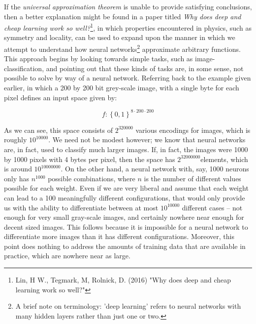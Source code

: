 \documentclass[11pt]{article}
\begin{document}
If the \textit{universal approximation theorem} is unable to provide satisfying conclusions, then a better explanation might be found in a paper titled \textit{Why does deep and cheap learning work so well?}\footnote{Lin, H W., Tegmark, M, Rolnick, D. (2016) "Why does deep and cheap learning work so well?"}, in which properties encountered in physics, such as symmetry and locality, can be used to expand upon the manner in which we attempt to understand how neural networks\footnote{A brief note on terminology: 'deep learning' refers to neural networks with many hidden layers rather than just one or two.} approximate arbitrary functions. This approach begins by looking towards simple tasks, such as image-classification, and pointing out that these kinds of tasks are, in some sense, not possible to solve by way of a neural network. Referring back to the example given earlier, in which a 200 by 200 bit grey-scale image, with a single byte for each pixel defines an input space given by:

\begin{equation}f: \left \{ 0,1 \right \}^{8\cdot 200 \cdot 200} \nonumber\end{equation}

As we can see, this space consists of $2^{320000}$ various encodings for images, which is roughly $10^{10000}$. We need not be modest however; we know that neural networks are, in fact, used to classify much larger images. If, in fact, the images were 1000 by 1000 pixels with 4 bytes per pixel, then the space has $2^{32000000}$elements, which is around $10^{10000000}$. On the other hand, a neural network with, say, 1000 neurons only has $n^{1000}$ possible combinations, where $n$ is the number of different values possible for each weight. Even if we are very liberal and assume that each weight can lead to a 100 meaningfully different configurations, that would only provide us with the ability to differentiate between at most $10^{10000}$ different cases – not enough for very small gray-scale images, and certainly nowhere near enough for decent sized images. This follows because it is impossible for a neural network to differentiate more images than it has different configurations. Moreover, this point does nothing to address the amounts of training data that are available in practice, which are nowhere near as large.
\end{document}
